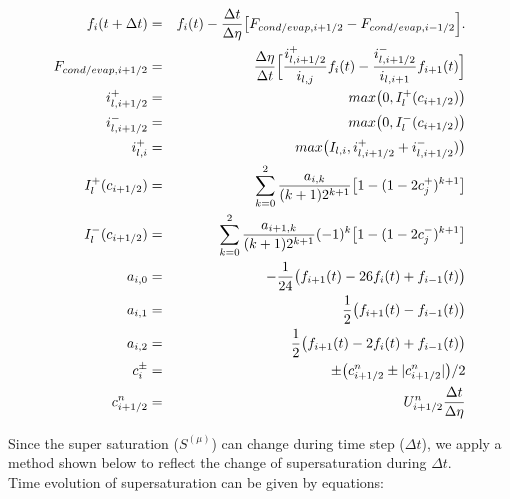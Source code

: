 \begin{eqnarray}
f_{i}(t+\Delta t)&=&f_{i}(t)-\frac{\Delta t}{\Delta \eta}\bigl [F_{cond/evap,i+1/2}-F_{cond/evap,i-1/2}\Bigr ].\nonumber\\
F_{cond/evap,i+1/2}&=&\frac{\Delta \eta}{\Delta t}\Bigl[ \frac{i^{+}_{l,i+1/2}}{i_{l,j}}f_{i}(t)-\frac{i^{-}_{l,i+1/2}}{i_{l,i+1}}f_{i+1}(t)\Bigr ]\nonumber\\
i^{+}_{l,i+1/2}&=&max\bigl(0,I^{+}_{l}(c_{i+1/2})\bigr)\nonumber\\
i^{-}_{l,i+1/2}&=&max\bigl(0,I^{-}_{l}(c_{i+1/2})\bigr)\nonumber\\
i^{+}_{l,i}&=&max\bigl(I_{l,i},i^{+}_{l,i+1/2}+i^{-}_{l,i+1/2})\bigr)\nonumber\\
I^{+}_{l}(c_{i+1/2})&=&\sum_{k=0}^{2}\frac{a_{i,k}}{(k+1)2^{k+1}}\bigl[1-(1-2c^{+}_{j})^{k+1}\bigr]\nonumber\\
I^{-}_{l}(c_{i+1/2})&=&\sum_{k=0}^{2}\frac{a_{i+1,k}}{(k+1)2^{k+1}}(-1)^{k}\bigl[1-(1-2c^{-}_{j})^{k+1}\bigr]\nonumber\\
a_{i,0}&=&-\frac{1}{24}\bigl( f_{i+1}(t)-26f_{i}(t)+f_{i-1}(t) \bigr)\nonumber\\
a_{i,1}&=&\frac{1}{2}\bigl( f_{i+1}(t)-f_{i-1}(t) \bigr)\nonumber\\
a_{i,2}&=&\frac{1}{2}\bigl( f_{i+1}(t)-2f_{i}(t)+f_{i-1}(t) \bigr)\nonumber\\
c_{i}^{\pm}&=&\pm\bigl( c^{n}_{i+1/2}\pm | c^{n}_{i+1/2}|\bigr )/2\nonumber\\
c^{n}_{i+1/2}&=&U^{n}_{i+1/2}\frac{\Delta t}{\Delta \eta}\label{s10-12}
\end{eqnarray}

Since the super saturation ($S^{(\mu)}$) can change during time step ($\Delta t$), we apply a method shown below to reflect the change of supersaturation during $\Delta t$.\\
Time evolution of supersaturation can be given by equations:

